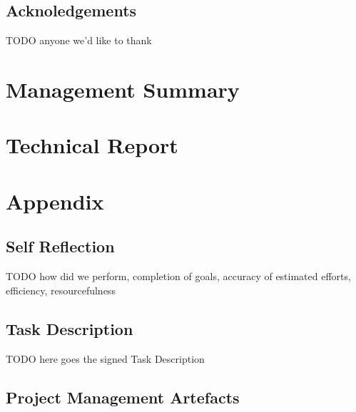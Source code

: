 \documentclass[a4paper]{report}
\begin{document}
\chapter*{Acknoledgements}
TODO anyone we'd like to thank

\tableofcontents
\listoffigures
\listoftables
\lstlistoflistings

\pagebreak
{}
\setcounter{page}{1}

\part{Management Summary}\label{part:mgmtsummary}


\part{Technical Report}







\printbibliography
\printglossaries

\appendix
\part{Appendix}
\chapter{Self Reflection}
TODO how did we perform, completion of goals, accuracy of estimated efforts, efficiency, resourcefulness

\chapter{Task Description}\label{ch:task-desc}
TODO here goes the signed Task Description\\
%

\chapter{Project Management Artefacts}
\end{document}
